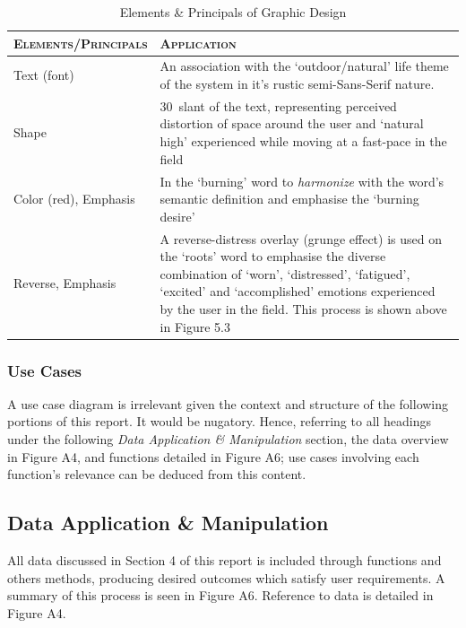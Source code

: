 \documentclass[11pt, english]{article}
\begin{document}
	\begin{table}[h]
		\scriptsize
		\renewcommand{\arraystretch}{1.25}
	\begin{center}
	\begin{tabular}{l|p{10cm}}
		\textsc{Elements/Principals} & \textsc{Application}\\
		\hline
		\hline
		Text (font) & An association with the `outdoor/natural' life theme of the system in it's rustic semi-Sans-Serif nature.\\
		Shape & 30\textdegree\ slant of the text, representing perceived distortion of space around the user and `natural high' experienced while moving at a fast-pace in the field\\
		Color (red), Emphasis & In the `burning' word to \textit{harmonize} with the word's semantic definition and emphasise the `burning desire'\\
		Reverse, Emphasis & A reverse-distress overlay (grunge effect) is used on the `roots' word to emphasise the diverse combination of `worn', `distressed', `fatigued', `excited' and `accomplished' emotions experienced by the user in the field. This process is shown above in Figure 5.3\\
		\hline
		\hline
	\end{tabular}
		\caption{Elements \& Principals of Graphic Design}
	\end{center}
	\end{table}

		\subsubsection{Use Cases}

	A use case diagram is irrelevant given the context and structure of the following portions of this report. It would be nugatory. Hence, referring to all headings under the following \textit{Data Application \& Manipulation} section, the data overview in Figure A4, and functions detailed in Figure A6; use cases involving each function's relevance can be deduced from this content.

	\subsection{Data Application \& Manipulation}

	All data discussed in Section 4 of this report is included through functions and others methods, producing desired outcomes which satisfy user requirements. A summary of this process is seen in Figure A6. Reference to data is detailed in Figure A4.
\end{document}
